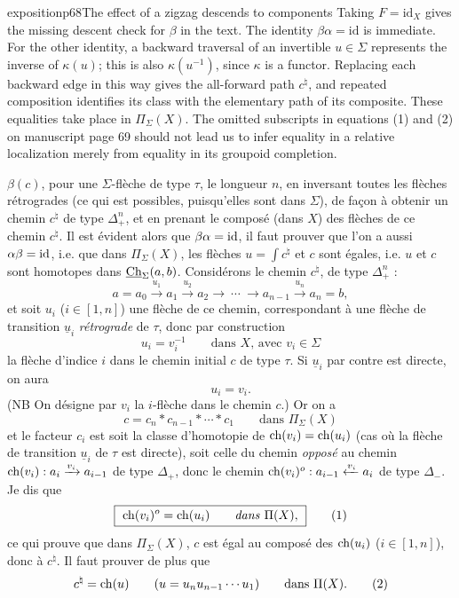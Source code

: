 \begin{dcomment}{exposition}{p68}{The effect of a zigzag descends to components}
Taking $F=\mathrm{id}_X$ gives the missing descent check for $\beta$ in the text. The identity $\beta\alpha=\mathrm{id}$ is immediate. For the other identity, a backward traversal of an invertible $u\in\Sigma$ represents the inverse of $\kappa(u)$; this is also $\kappa(u^{-1})$, since $\kappa$ is a functor. Replacing each backward edge in this way gives the all-forward path $c^\natural$, and repeated composition identifies its class with the elementary path of its composite. These equalities take place in $\Pi_\Sigma(X)$. The omitted subscripts in equations (1) and (2) on manuscript page 69 should not lead us to infer equality in a relative localization merely from equality in its groupoid completion.
\end{dcomment}


$\beta(c)$, pour une $\Sigma$-flèche de type $\tau$, le longueur $n$, en inversant toutes les flèches rétrogrades (ce qui est possibles, puisqu'elles sont dans $\Sigma$), de façon à obtenir un chemin $c^\natural$ de type $\Delta_+^n$, et en prenant le composé (dans $X$) des flèches de ce chemin $c^\natural$. Il est évident alors que $\beta\alpha = \mathrm{id}$, il faut prouver que l'on a aussi $\alpha\beta = \mathrm{id}$, i.e. que dans $\Pi_\Sigma(X)$, les flèches $u = \int c^\natural$ et $c$ sont égales, i.e. $u$ et $c$ sont homotopes dans $\underline{\mathrm{Ch}}_\Sigma(a,b)$. Considérons le chemin $c^\natural$, de type $\Delta_+^n$ : %
\[
a = a_0 \xrightarrow{u_1} a_1 \xrightarrow{u_2} a_2 \longrightarrow \ \cdots \ \longrightarrow a_{n-1} \xrightarrow{u_n} a_n = b,
\]
et soit $u_i$ ($i \in [1,n]$) une flèche de ce chemin, correspondant à une flèche de transition $\underline{u}_i$ \textit{rétrograde} de $\tau$, donc par construction
\[
u_i = v_i^{-1} \qquad \text{dans } X\text{, avec } v_i \in \Sigma
\]
la flèche d'indice $i$ dans le chemin initial $c$ de type $\tau$. Si $\underline{u}_i$ par contre est directe, on aura
\[
u_i = v_i.
\]
(NB On désigne par $v_i$ la $i$-flèche dans le chemin $c$.) Or on a
\[
c = c_n * c_{n-1} * \cdots * c_1 \qquad \text{dans } \Pi_\Sigma(X)
\tag*{$(*)$}
\]
et le facteur $c_i$ est soit la classe d'homotopie de $\mathrm{ch}(v_i) = \mathrm{ch}(u_i)$ (cas où la flèche de transition $\underline{u}_i$ de $\tau$ est directe), soit celle du chemin \textit{opposé} au chemin $\mathrm{ch}(v_i) : a_i \xrightarrow{v_i} a_{i-1}$ de type $\Delta_+$, donc le chemin $\mathrm{ch}(v_i)^o : a_{i-1} \xleftarrow{v_i} a_i$ de type $\Delta_-$. Je dis que
\[
\boxed{\ \mathrm{ch}(v_i)^o = \mathrm{ch}(u_i) \qquad \text{\textit{dans} } \Pi(X),\ }
\tag*{(1)}
\]
ce qui prouve que dans $\Pi_\Sigma(X)$, $c$ est égal au composé des $\mathrm{ch}(u_i)$ ($i \in [1,n]$), donc à $c^\natural$. Il faut prouver de plus que
\[
c^\natural = \mathrm{ch}(u) \qquad (u = u_nu_{n-1}\cdots u_1) \qquad \text{dans } \Pi(X).
\tag*{(2)}
\]

